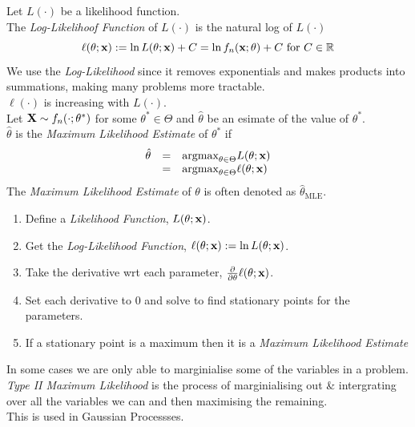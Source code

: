 \documentclass[11pt,a4paper]{article}
\begin{document}
Let $L(\cdot)$ be a likelihood function.\\
The \textit{Log-Likelihoof Function} of $L(\cdot)$ is the natural log of $L(\cdot)$
$$\ell(\theta;\textbf{x}):=\ln L(\theta;\textbf{x})+C=\ln f_n(\textbf{x};\theta)+C\text{ for }C\in\mathbb{R}$$
We use the \textit{Log-Likelihood} since it removes exponentials and makes products into summations, making many problems more tractable.\\
\nb $\ell(\cdot)$ is increasing with $L(\cdot)$.\\

Let $\textbf{X}\sim f_n(\cdot;\theta^*)$ for some $\theta^*\in\Theta$ and $\hat\theta$ be an esimate of the value of $\theta^*$.\\
$\hat\theta$ is the \textit{Maximum Likelihood Estimate} of $\theta^*$ if
\[\begin{array}{rcl}
\hat\theta&=&\text{argmax}_{\theta\in\Theta}L(\theta;\textbf{x})\\
&=&\text{argmax}_{\theta\in\Theta}\ell(\theta;\textbf{x})
\end{array}\]
\nb The \textit{Maximum Likelihood Estimate} of $\theta$ is often denoted as $\hat\theta_\text{MLE}$.\\

\begin{enumerate}
	\item Define a \textit{Likelihood Function}, $L(\theta;\textbf{x})$.
	\item Get the \textit{Log-Likelihood Function}, $\ell(\theta;\textbf{x}):=\ln L(\theta;\textbf{x})$.
	\item Take the derivative wrt each parameter, $\frac{\partial}{\partial\theta}\ell(\theta;\textbf{x})$.
	\item Set each derivative to 0 and solve to find stationary points for the parameters.
	\item If a stationary point is a maximum then it is a \textit{Maximum Likelihood Estimate}
\end{enumerate}

In some cases we are only able to marginialise some of the variables in a problem.\\
\textit{Type II Maximum Likelihood} is the process of marginialising out \& intergrating over all the variables we can and then maximising the remaining.\\
\nb This is used in Gaussian Processses.
\end{document}
